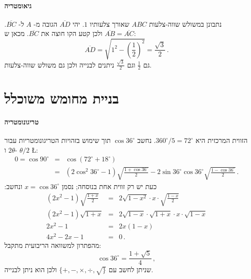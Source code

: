 \documentclass[11pt,a4paper]{article}
\newenvironment{form}[1]{%
\begin{displaymath}%
\renewcommand{\arraystretch}{#1}%
\begin{array}{lcl}}%
{\end{array}%
\end{displaymath}%
}
\newcommand*{\disfrac}[2]{\displaystyle\frac{#1}{#2}}
\begin{document}
\paragraph{גיאומטריה}
נתבונן במשולש שווה-צלעות
$ABC$
שאורך צלעותיו 
$1$.
יהי
$\overline{AD}$
הגובה מ-%
$A$
ל-%
$\overline{BC}$.
$\overline{AB}=\overline{AC}$
ולכן קטע הקו חוצה את
$\overline{BC}$.
מכאן ש:
\[
\overline{AD}= \sqrt{1^2-\left(\disfrac{1}{2}\right)^2}=\disfrac{\sqrt{3}}{2}\,.
\]
גם
$\frac{1}{2}$
וגם
$\frac{\sqrt{3}}{2}$
ניתנים לבנייה ולכן גם משולש שווה-צלעות.
\begin{center}
\end{center}


\section{בניית מחומש משוכלל}\label{a.pentagon}

\paragraph{טריגונומטריה}
הזווית המרכזית היא
$360^\circ/5=72^\circ$.
נחשב
$\cos 36^\circ$
תוך שימוש בזהויות הטריגונומטריות עבור
$2\theta$
ו-%
$\theta/2$
\L{\cite{wiki:pentagon}}:
\begin{form}{1.5}
0=\cos 90^\circ &=& \cos(72^\circ+18^\circ)\\
&=&(2\cos^2 36^\circ-1)\sqrt{\disfrac{1+\cos 36^\circ}{2}}-2\sin 36^\circ\cos 36^\circ\sqrt{\disfrac{1-\cos 36^\circ}{2}}\,.
\end{form}
כעת יש רק זווית אחת בנוסחה; נסמן
$x=\cos 36^\circ$ 
ונחשב:
\begin{form}{1.5}
(2x^2-1)\sqrt{\disfrac{1+x}{2}}&=&2\sqrt{1-x^2}\cdot x \cdot \sqrt{\disfrac{1-x}{2}}\\
(2x^2-1)\sqrt{1+x}&=&2\sqrt{1-x}\cdot\sqrt{1+x}\cdot x \cdot \sqrt{1-x}\\
2x^2-1&=&2x(1-x)\\
4x^2-2x-1&=&0\,.
\end{form}
מהפתרון למשוואה הריבועית מתקבל:
\[
\cos 36^\circ = \disfrac{1+\sqrt{5}}{4}\,,
\]
שניתן לחשב עם
$\{+,-,\times,\div,\surd\}$
ולכן הוא ניתן לבנייה.
\end{document}
